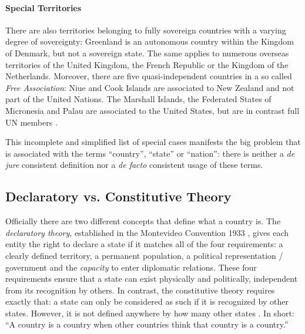 \paragraph{Special Territories} %
\label{par:special_territories}

There are also territories belonging to fully sovereign countries with a varying degree of sovereignty: Greenland is an autonomous country within the Kingdom of Denmark, but not a sovereign state. The same applies to numerous overseas territories of the United Kingdom, the French Republic or the Kingdom of the Netherlands. Moreover, there are five quasi-independent countries in a so called \emph{Free Association}: Niue and Cook Islands are associated to New Zealand and not part of the United Nations. The Marshall Islands, the Federated States of Micronesia and Palau are associated to the United States, but are in contrast full UN members \cite{SpecialTerritories}.


This incomplete and simplified list of special cases manifests the big problem that is associated with the terms ``country'', ``state'' or ``nation'': there is neither a \emph{de jure} consistent definition nor a \emph{de facto} consistent usage of these terms.


\subsection{Declaratory vs. Constitutive Theory} %
\label{sub:declaratory_vs_constitutive_theory}

Officially there are two different concepts that define what a country is. The \emph{declaratory theory}, established in the Montevideo Convention 1933 \cite{MontevideoConvention}, gives each entity the right to declare a state if it matches all of the four requirements: a clearly defined territory, a permanent population, a political representation / government and the \emph{capacity} to enter diplomatic relations. These four requirements ensure that a state can exist physically and politically, independent from its recognition by others.
In contrast, the constitutive theory requires exactly that: a state can only be considered as such if it is recognized by other states. However, it is not defined anywhere by how many other states \cite{StateTheory}. In short: ``A country is a country when other countries think that country is a country.'' \cite{greyCountries}

